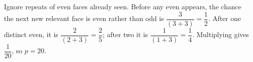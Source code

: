 Ignore repeats of even faces already seen. Before any even appears, the chance the next new relevant face is even rather than odd is $\dfrac{3}{(3+3)}=\dfrac{1}{2}$. After one distinct even, it is $\dfrac{2}{(2+3)}=\dfrac{2}{5}$; after two it is $\dfrac{1}{(1+3)}=\dfrac{1}{4}$. Multiplying gives $\dfrac{1}{20}$, so $\boxed{p=20}$.

